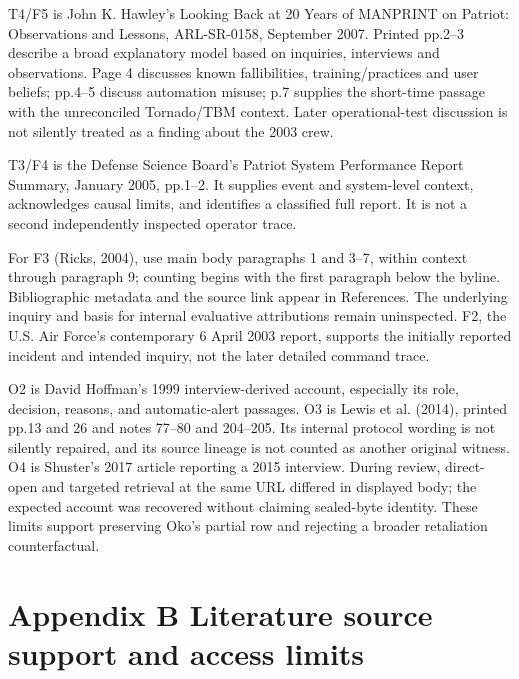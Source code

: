 \documentclass[11pt]{article}
\begin{document}
T4/F5 is John K. Hawley's Looking Back at 20 Years of MANPRINT on Patriot: Observations and Lessons, ARL-SR-0158, September 2007. Printed pp.2--3 describe a broad explanatory model based on inquiries, interviews and observations. Page 4 discusses known fallibilities, training/practices and user beliefs; pp.4--5 discuss automation misuse; p.7 supplies the short-time passage with the unreconciled Tornado/TBM context. Later operational-test discussion is not silently treated as a finding about the 2003 crew.

T3/F4 is the Defense Science Board's Patriot System Performance Report Summary, January 2005, pp.1--2. It supplies event and system-level context, acknowledges causal limits, and identifies a classified full report. It is not a second independently inspected operator trace.

For F3 (Ricks, 2004), use main body paragraphs 1 and 3--7, within context through paragraph 9; counting begins with the first paragraph below the byline. Bibliographic metadata and the source link appear in References. The underlying inquiry and basis for internal evaluative attributions remain uninspected. F2, the U.S. Air Force's contemporary 6 April 2003 report, supports the initially reported incident and intended inquiry, not the later detailed command trace.

O2 is David Hoffman's 1999 interview-derived account, especially its role, decision, reasons, and automatic-alert passages. O3 is Lewis et al. (2014), printed pp.13 and 26 and notes 77--80 and 204--205. Its internal protocol wording is not silently repaired, and its source lineage is not counted as another original witness. O4 is Shuster's 2017 article reporting a 2015 interview. During review, direct-open and targeted retrieval at the same URL differed in displayed body; the expected account was recovered without claiming sealed-byte identity. These limits support preserving Oko's partial row and rejecting a broader retaliation counterfactual.

\clearpage
{}
\section*{Appendix B Literature source support and access limits}
\end{document}
